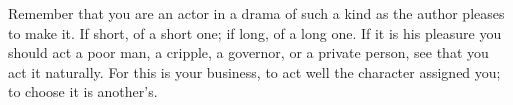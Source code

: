 Remember that you are an actor in a  drama of such a kind as the author pleases
to make  it. If short, of  a short one;  if long, of a  long one. If it  is his
pleasure you should act a poor man, a cripple, a governor, or a private person,
see that  you act  it naturally.  For this is  your business,  to act  well the
character assigned you; to choose it is another's.

